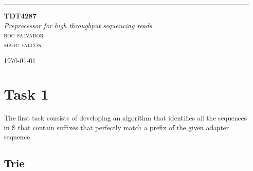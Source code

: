 \documentclass[a4paper,10pt]{article}
\begin{document}
\begin{titlepage} %
	
	\raggedleft %
	
	\rule{1pt}{\textheight} %
	\hspace{0.02\textwidth} %
	\parbox[b]{0.75\textwidth}{ %
		
		{\Huge\bfseries TDT4287}\\[2\baselineskip] %
		{\large\textit{Preprocessor for high throughput sequencing reads}}\\[4\baselineskip] %
		{\Large\textsc{roc salvador\\marc falcón}} %
		
		\vspace{0.5\textheight} %
		
		{\noindent \today}\\[\baselineskip] %
	}

\end{titlepage}


\tableofcontents

\newpage

\section{Task 1} \label{task1}

\paragraph{} The first task consists of developing an algorithm that identifies all the sequences in S that contain suffixes that perfectly match a prefix of the given adapter sequence.

\subsection{Trie}
\end{document}
